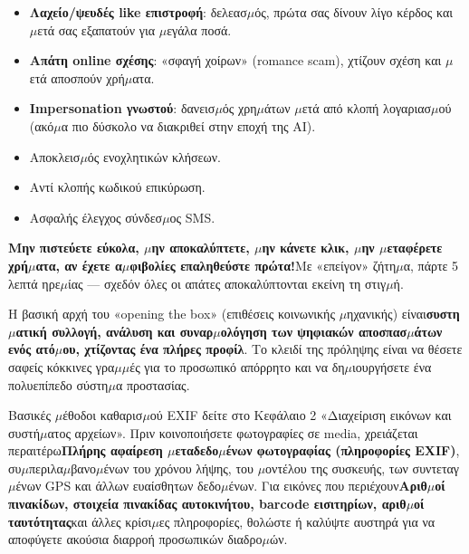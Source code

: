 
\begin{itemize}
  \item \textbf{Λαχείο/ψευδές like επιστροφή}: δελεασ$\mu$ός, πρώτα σας δίνουν λίγο κέρδος και $\mu$ετά σας εξαπατούν για $\mu$εγάλα ποσά.
  \item \textbf{Απάτη online σχέσης}: «σφαγή χοίρων» (romance scam), χτίζουν σχέση και $\mu$ετά αποσπούν χρή$\mu$ατα.
  \item \textbf{Impersonation γνωστού}: δανεισ$\mu$ός χρη$\mu$άτων $\mu$ετά από κλοπή λογαριασ$\mu$ού (ακό$\mu$α πιο δύσκολο να διακριθεί στην εποχή της AI).
\end{itemize}


\begin{itemize}
  \item Αποκλεισ$\mu$ός ενοχλητικών κλήσεων.
  \item Αντί κλοπής κωδικού επικύρωση.
  \item Ασφαλής έλεγχος σύνδεσ$\mu$ος SMS.
\end{itemize}


\textbf{Μην πιστεύετε εύκολα, $\mu$ην αποκαλύπτετε, $\mu$ην κάνετε κλικ, $\mu$ην $\mu$εταφέρετε χρή$\mu$ατα, αν έχετε α$\mu$φιβολίες επαληθεύστε πρώτα!}Με «επείγον» ζήτη$\mu$α, πάρτε 5 λεπτά ηρε$\mu$ίας — σχεδόν όλες οι απάτες αποκαλύπτονται εκείνη τη στιγ$\mu$ή.


Η βασική αρχή του «opening the box» (επιθέσεις κοινωνικής $\mu$ηχανικής) είναι\textbf{συστη$\mu$ατική συλλογή, ανάλυση και συναρ$\mu$ολόγηση των ψηφιακών αποσπασ$\mu$άτων ενός ατό$\mu$ου, χτίζοντας ένα πλήρες προφίλ}. Το κλειδί της πρόληψης είναι να θέσετε σαφείς κόκκινες γρα$\mu$$\mu$ές για το προσωπικό απόρρητο και να δη$\mu$ιουργήσετε ένα πολυεπίπεδο σύστη$\mu$α προστασίας.


Βασικές $\mu$έθοδοι καθαρισ$\mu$ού EXIF δείτε στο Κεφάλαιο 2 «Διαχείριση εικόνων και συστή$\mu$ατος αρχείων». Πριν κοινοποιήσετε φωτογραφίες σε media, χρειάζεται περαιτέρω\textbf{Πλήρης αφαίρεση $\mu$εταδεδο$\mu$ένων φωτογραφίας (πληροφορίες EXIF)}, συ$\mu$περιλα$\mu$βανο$\mu$ένων του χρόνου λήψης, του $\mu$οντέλου της συσκευής, των συντεταγ$\mu$ένων GPS και άλλων ευαίσθητων δεδο$\mu$ένων. Για εικόνες που περιέχουν\textbf{Αριθ$\mu$οί πινακίδων, στοιχεία πινακίδας αυτοκινήτου, barcode εισιτηρίων, αριθ$\mu$οί ταυτότητας}και άλλες κρίσι$\mu$ες πληροφορίες, θολώστε ή καλύψτε αυστηρά για να αποφύγετε ακούσια διαρροή προσωπικών διαδρο$\mu$ών.

